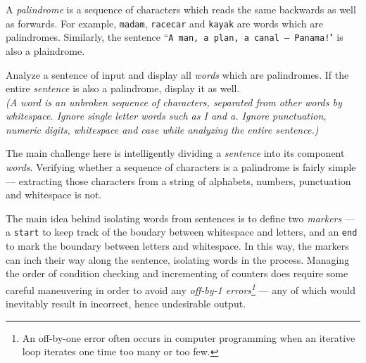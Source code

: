 

\problem A {\em palindrome} is a sequence of characters which reads the same backwards as well as forwards.
For example, {\tt madam}, {\tt racecar} and {\tt kayak} are words which are palindromes. Similarly, the sentence ``{\tt A man, a plan, a canal -- Panama!}" is also a plaindrome.

Analyze a sentence of input and display all {\em words} which are palindromes. If the entire {\em sentence} is also a palindrome, display it as well.\\

{\em (A word is an unbroken sequence of characters, separated from other words by whitespace. Ignore single letter words such as {\em I} and {\em a}.
Ignore punctuation, numeric digits, whitespace and case while analyzing the entire sentence.)}

\solution The main challenge here is intelligently dividing a {\em sentence} into its component {\em words}. Verifying whether a sequence of characters is a palindrome is fairly simple --- extracting those characters from a string of alphabets, numbers, punctuation and whitespace is not.

The main idea behind isolating words from sentences is to define two {\em markers} --- a {\tt start} to keep track of the boudary between whitespace and letters, and an {\tt end} to mark the boundary between letters and whitespace. In this way, the markers can inch their way along the sentence, isolating words in the process. Managing the order of condition checking and incrementing of counters does require some careful maneuvering in order to avoid any {\em off-by-1 errors\footnote{An off-by-one error often occurs in computer programming when an iterative loop iterates one time too many or too few.}} ---  any of which would inevitably result in incorrect, hence undesirable output.\citeneeded

